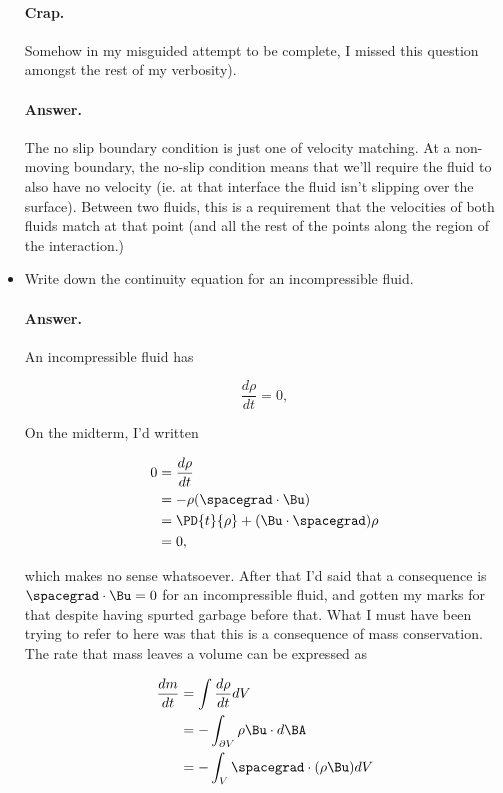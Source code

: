 \begin{itemize}
\paragraph{Crap.} Somehow in my misguided attempt to be complete, I missed this question amongst the rest of my verbosity).

\paragraph{Answer.}
The no slip boundary condition is just one of velocity matching.  At a non-moving boundary, the no-slip condition means that we'll require the fluid to also have no velocity (ie. at that interface the fluid isn't slipping over the surface).  Between two fluids, this is a requirement that the velocities of both fluids match at that point (and all the rest of the points along the region of the interaction.)

\item Write down the continuity equation for an incompressible fluid.
\paragraph{Answer.}

An incompressible fluid has

\begin{equation}\label{eqn:continuumMidTermReflection:210}
\frac{d\rho}{dt} = 0,
\end{equation}

On the midterm, I'd written

\begin{align*}
0 
&=
\frac{d\rho}{dt} \\
&= - \rho (\spacegrad \cdot \Bu)  \\
&= 
\PD{t}{\rho} + (\Bu \cdot \spacegrad) \rho \\
&= 0,
\end{align*}

which makes no sense whatsoever.  After that I'd said that a consequence is $\spacegrad \cdot \Bu = 0$ for an incompressible fluid, and gotten my marks for that despite having spurted garbage before that.  What I must have been trying to refer to here was that this is a consequence of mass conservation.  The rate that mass leaves a volume can be expressed as

\begin{align*}
\frac{dm}{dt}
&= \int \frac{d\rho}{dt} dV \\
&= -\int_{\partial V} \rho \Bu \cdot d\BA \\
&= -\int_V \spacegrad \cdot (\rho \Bu) dV
\end{align*}


\end{itemize}
